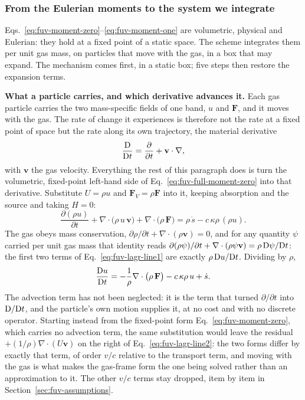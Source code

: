 \subsubsection{From the Eulerian moments to the system we integrate}
\label{sec:fuv-lagrangian}

Eqs.~\ref{eq:fuv-moment-zero}--\ref{eq:fuv-moment-one} are volumetric,
physical and Eulerian: they hold at a fixed point of a static space. The
scheme integrates them per unit gas mass, on particles that move with the
gas, in a box that may expand. The mechanism comes first, in a static box;
five steps then restore the expansion terms.

\textbf{What a particle carries, and which derivative advances it.} Each
gas particle carries the two mass-specific fields of one band, $u$ and
$\mathbf F$, and it moves with the gas. The rate of change it experiences
is therefore not the rate at a fixed point of space but the rate along its
own trajectory, the material derivative
\begin{equation}
  \frac{{\rm D}}{{\rm D}t} = \frac{\partial}{\partial t} +
    \mathbf v\cdot\nabla ,
  \label{eq:fuv-lagrangian-derivative}
\end{equation}
with $\mathbf v$ the gas velocity. Everything the rest of this paragraph
does is turn the volumetric, fixed-point left-hand side of
Eq.~\ref{eq:fuv-full-moment-zero} into that derivative. Substitute $U =
\rho u$ and $\mathbf F_V = \rho\mathbf F$ into it, keeping absorption and
the source and taking $H = 0$:
\begin{equation}
  \frac{\partial(\rho u)}{\partial t}
  + \nabla\cdot\big(\rho\,u\,\mathbf v\big)
  + \nabla\cdot\big(\rho\,\mathbf F\big)
  = \rho\,\dot s - c\,\kappa\rho\,(\rho u) .
  \label{eq:fuv-lagr-line1}
\end{equation}
The gas obeys mass conservation, $\partial\rho/\partial t +
\nabla\cdot(\rho\mathbf v) = 0$, and for any quantity $\psi$ carried per
unit gas mass that identity reads $\partial(\rho\psi)/\partial t +
\nabla\cdot(\rho\psi\mathbf v) = \rho\,{\rm D}\psi/{\rm D}t$: the first
two terms of Eq.~\ref{eq:fuv-lagr-line1} are exactly $\rho\,{\rm D}u/{\rm
D}t$. Dividing by $\rho$,
\begin{equation}
  \frac{{\rm D}u}{{\rm D}t}
  = -\frac{1}{\rho}\nabla\cdot\big(\rho\,\mathbf F\big)
    - c\,\kappa\rho\,u + \dot s .
  \label{eq:fuv-lagr-line2}
\end{equation}
The advection term has not been neglected: it is the term that turned
$\partial/\partial t$ into ${\rm D}/{\rm D}t$, and the particle's own
motion supplies it, at no cost and with no discrete operator. Starting
instead from the fixed-point form
Eq.~\ref{eq:fuv-moment-zero}, which carries no advection term, the same
substitution would leave the residual
$+(1/\rho)\nabla\cdot(U\mathbf v)$ on the right of
Eq.~\ref{eq:fuv-lagr-line2}: the two forms differ by exactly that term, of
order $v/c$ relative to the transport term, and moving with the gas is
what makes the gas-frame form the one being solved rather than an
approximation to it. The other $v/c$ terms stay dropped, item by item in
Section~\ref{sec:fuv-assumptions}.

